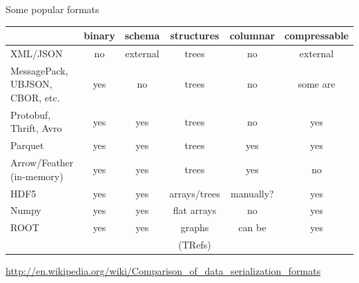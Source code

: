 \documentclass{beamer}
\begin{document}
\begin{frame}{Some popular formats}
\vspace{0.25 cm}
\renewcommand{\arraystretch}{1.2}
\mbox{\hspace{-0.8 cm}}\begin{tabular}{p{2 cm} c c c c c}
                          & binary & schema     & structures   & columnar & compressable\\\hline
XML/JSON                  & no     & external   & trees        & no       & external    \\
MessagePack, UBJSON, CBOR, etc.   & yes    & no         & trees        & no       & some are    \\
Protobuf, Thrift, Avro    & yes    & yes        & trees        & no       & yes         \\
Parquet                   & yes    & yes        & trees        & yes      & yes         \\
Arrow/Feather (in-memory) & yes    & yes        & trees        & yes      & no          \\
HDF5                      & yes    & yes        & arrays/trees & manually?& yes         \\
Numpy                     & yes    & yes        & flat arrays  & no       & yes         \\
ROOT                      & yes    & yes        & graphs       & can be   & yes         \\
                          &        &            & (TRefs)      &          &             \\
\end{tabular}

\vspace{0.25 cm}
\scriptsize \mbox{\hspace{-0.5 cm}\textcolor{blue}{\url{http://en.wikipedia.org/wiki/Comparison_of_data_serialization_formats}}}
\end{frame}
\end{document}
